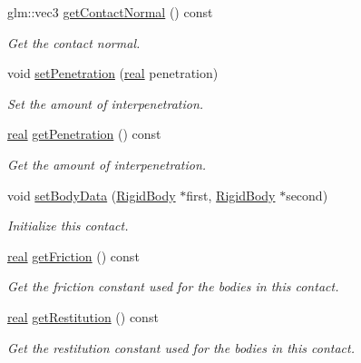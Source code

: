 \begin{DoxyCompactItemize}
glm\+::vec3 \mbox{\hyperlink{classr3_1_1_contact_a2d8f594947a1900fd21e2f707384d9fe}{get\+Contact\+Normal}} () const
\begin{DoxyCompactList}\small\item\em Get the contact normal. \end{DoxyCompactList}\item 
void \mbox{\hyperlink{classr3_1_1_contact_a828feb22ff02fe787739eb5d87cfec38}{set\+Penetration}} (\mbox{\hyperlink{namespacer3_ab2016b3e3f743fb735afce242f0dc1eb}{real}} penetration)
\begin{DoxyCompactList}\small\item\em Set the amount of interpenetration. \end{DoxyCompactList}\item 
\mbox{\hyperlink{namespacer3_ab2016b3e3f743fb735afce242f0dc1eb}{real}} \mbox{\hyperlink{classr3_1_1_contact_afe0f0a9a42b4b1f8bd8a61f0b6a4afdd}{get\+Penetration}} () const
\begin{DoxyCompactList}\small\item\em Get the amount of interpenetration. \end{DoxyCompactList}\item 
void \mbox{\hyperlink{classr3_1_1_contact_a7471ab195f0cadaee4e2f27f15bb9fff}{set\+Body\+Data}} (\mbox{\hyperlink{classr3_1_1_rigid_body}{Rigid\+Body}} $\ast$first, \mbox{\hyperlink{classr3_1_1_rigid_body}{Rigid\+Body}} $\ast$second)
\begin{DoxyCompactList}\small\item\em Initialize this contact. \end{DoxyCompactList}\item 
\mbox{\hyperlink{namespacer3_ab2016b3e3f743fb735afce242f0dc1eb}{real}} \mbox{\hyperlink{classr3_1_1_contact_a1a547c3852733960001cc5fe0fe06790}{get\+Friction}} () const
\begin{DoxyCompactList}\small\item\em Get the friction constant used for the bodies in this contact. \end{DoxyCompactList}\item 
\mbox{\hyperlink{namespacer3_ab2016b3e3f743fb735afce242f0dc1eb}{real}} \mbox{\hyperlink{classr3_1_1_contact_a8ec701dcaf82e7fc65bc6c4a2cb6987e}{get\+Restitution}} () const
\begin{DoxyCompactList}\small\item\em Get the restitution constant used for the bodies in this contact. \end{DoxyCompactList}\item 

\end{DoxyCompactItemize}
